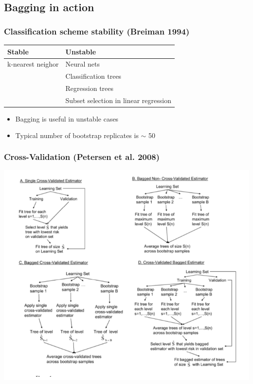 \documentclass[bigger]{beamer}
\begin{document}
\subsection{Bagging in action}
\label{sec-1-3}
\begin{frame}
\frametitle{Classification scheme stability (Breiman 1994)}
\label{sec-1-3-1}



\begin{center}
\begin{tabular}{ll}
 Stable             &  Unstable                               \\
\hline
 k-nearest neighor  &  Neural nets                            \\
                    &  Classification trees                   \\
                    &  Regression trees                       \\
                    &  Subset selection in linear regression  \\
\hline
\end{tabular}
\end{center}



\begin{itemize}
\item Bagging is useful in unstable cases
\item Typical number of bootstrap replicates is $\sim$ 50
\end{itemize}
\end{frame}
\begin{frame}
\frametitle{Cross-Validation (Petersen et al. 2008)}
\label{sec-1-3-2}


\includegraphics[width=.9\linewidth]{./PetersenFig1.png}
\end{frame}
\end{document}
